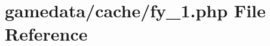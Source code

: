 \hypertarget{fy__1_8php}{\section{gamedata/cache/fy\+\_\+1.php File Reference}
\label{fy__1_8php}
}
